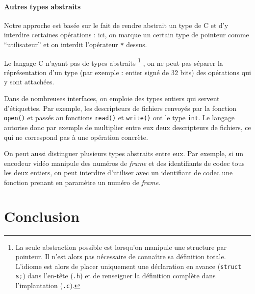 \paragraph{Autres types abstraits}

Notre approche est basée sur le fait de rendre abstrait un type de C et
d'y interdire certaines opérations : ici, on marque un certain type de pointeur
comme ``utilisateur'' et on interdit l'opérateur \texttt{*} dessus.

Le langage C n'ayant pas de types abstraits
\footnote{
  La seule abstraction possible est lorsqu'on manipule une structure par
  pointeur. Il n'est alors pas nécessaire de connaître sa définition totale.
  L'idiome est alors de placer uniquement une déclaration en avance
  (\texttt{struct s;}) dans l'en-tête (\texttt{.h}) et de renseigner
  la définition complète dans l'implantation (\texttt{.c}).
}
, on ne peut pas séparer la réprésentation d'un type (par exemple : entier signé
de 32 bits) des opérations qui y sont attachées.

Dans de nombreuses interfaces, on emploie des types entiers qui servent
d'étiquettes. Par exemple, les descripteurs de fichiers renvoyés par la fonction
\texttt{open()} et passés au fonctions \texttt{read()} et \texttt{write()} ont
le type \texttt{int}. Le langage autorise donc par exemple de multiplier entre
eux deux descripteurs de fichiers, ce qui ne correspond pas à une opération
concrète.

On peut aussi distinguer plusieurs types abstraits entre eux. Par exemple, si un
encodeur vidéo manipule des numéros de \emph{frame} et des identifiants de codec
tous les deux entiers, on peut interdire d'utiliser avec un identifiant de codec
une fonction prenant en paramètre un numéro de \emph{frame}.

\section{Conclusion}


\wip
